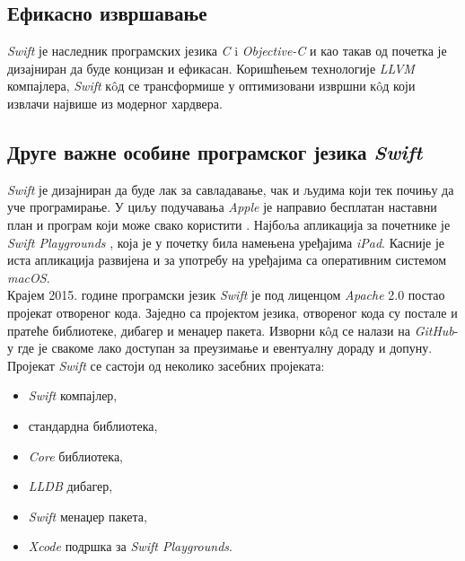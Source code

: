 \documentclass[12pt,oneside]{memoir}
\begin{document}
\subsection{Ефикасно извршавање}

\indent \textit{Swift} је наследник програмских језика \textit{C} i \textit{Objective-C} и као такав од почетка је дизајниран да буде концизан и ефикасан. Коришћењем технологије \textit{LLVM} компајлера, \textit{Swift} к\^{o}д се трансформише у оптимизовани извршни к\^{o}д који извлачи највише из модерног хардвера. 

\subsection{Друге важне особине програмског језика \textit{Swift}}

\indent \textit{Swift} је дизајниран да буде лак за савладавање, чак и људима који тек почињу да уче програмирање. У циљу подучавања \textit{Apple} је направио бесплатан наставни план и програм који може свако користити \cite{Swift_Education}. Најбоља апликација за почетнике је \textit{Swift Playgrounds} \cite{Swift_Playground}, која је у почетку била намењена уређајима \textit{iPad}. Касније је иста апликација развијена и за употребу на уређајима са оперативним системом \textit{macOS}. 
\\
\indent Крајем 2015. године програмски језик \textit{Swift} је под лиценцом \textit{Apache} 2.0 постао пројекат отвореног кода. Заједно са пројектом језика, отвореног кода су постале и пратеће библиотеке, дибагер и менаџер пакета. Изворни к\^{o}д се налази на \textit{GitHub}-у где је свакоме лако доступан за преузимање и евентуалну дораду и допуну. Пројекат \textit{Swift} се састоји од неколико засебних пројеката: 
\begin{itemize}
    \item \textit{Swift} компајлер,
    \item стандардна библиотека,
    \item \textit{Core} библиотека,
    \item \textit{LLDB} дибагер,
    \item \textit{Swift} менаџер пакета,
    \item \textit{Xcode} подршка за \textit{Swift Playgrounds}.
\end{itemize}
\end{document}
